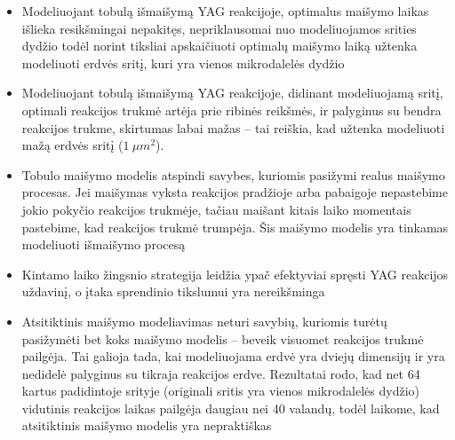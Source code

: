 \begin{itemize}
    
    \item Modeliuojant tobulą išmaišymą YAG reakcijoje, optimalus maišymo laikas išlieka resikšmingai nepakitęs, nepriklausomai nuo modeliuojamos srities dydžio todėl norint tiksliai apskaičiuoti optimalų maišymo laiką užtenka modeliuoti erdvės sritį, kuri yra vienos mikrodalelės dydžio

    \item Modeliuojant tobulą išmaišymą YAG reakcijoje, didinant modeliuojamą sritį, optimali reakcijos trukmė artėja prie ribinės reikšmės, ir palyginus su bendra reakcijos trukme, skirtumas labai mažas -- tai reiškia, kad užtenka modeliuoti mažą erdvės sritį ($1\ \mu m^2$).

    \item Tobulo maišymo modelis atspindi savybes, kuriomis pasižymi realus maišymo procesas. Jei maišymas vyksta reakcijos pradžioje arba pabaigoje nepastebime jokio pokyčio reakcijos trukmėje, tačiau maišant kitais laiko momentais pastebime, kad reakcijos trukmė trumpėja. Šis maišymo modelis yra tinkamas modeliuoti išmaišymo procesą

    \item Kintamo laiko žingsnio strategija leidžia ypač efektyviai spręsti YAG reakcijos uždavinį, o įtaka sprendinio tikslumui yra nereikšminga

    \item Atsitiktinis maišymo modeliavimas neturi savybių, kuriomis turėtų pasižymėti bet koks maišymo modelis -- beveik visuomet reakcijos trukmė pailgėja. Tai galioja tada, kai modeliuojama erdvė yra dviejų dimensijų ir yra nedidelė palyginus su tikraja reakcijos erdve. Rezultatai rodo, kad net 64 kartus padidintoje srityje (originali sritis yra vienos mikrodalelės dydžio) vidutinis reakcijos laikas pailgėja daugiau nei 40 valandų, todėl laikome, kad atsitiktinis maišymo modelis yra nepraktiškas

\end{itemize}
